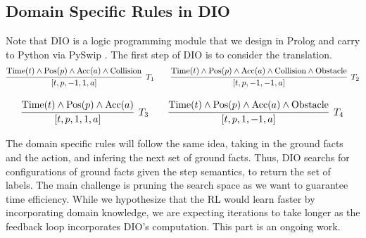 \documentclass[a4paper,11pt]{article}
\theoremstyle{definition}
\begin{document}
\subsection{Domain Specific Rules in DIO}
Note that DIO is a logic programming module that we design in Prolog and 
carry to Python via PySwip \cite{tekol2020}.
The first step of DIO is to consider the translation. 
\[
  \infer[T_1]{[t, p, -1, 1, a]}{\text{Time}(t) \wedge \text{Pos}(p) 
                                \wedge \text{Acc}(a) \wedge
                              \text{Collision}}
   \qquad
   \infer[T_2]{[t, p, -1, -1, a]}{\text{Time}(t) \wedge \text{Pos}(p) 
                                  \wedge \text{Acc}(a) \wedge
                                  \text{Collision} \wedge \text{Obstacle}}
\]

\[
  \infer[T_3]{[t, p, 1, 1, a]}{\text{Time}(t) \wedge \text{Pos}(p) 
                                \wedge \text{Acc}(a)
                            }
   \qquad
   \infer[T_4]{[t, p, 1, -1, a]}{\text{Time}(t) \wedge \text{Pos}(p) 
                                  \wedge \text{Acc}(a) \wedge \text{Obstacle}}
\]

The domain specific rules will follow the same idea, taking in the ground facts and the action, 
and infering the next set of ground facts. Thus, DIO searchs for configurations of ground facts given the step semantics, 
to return the set of labels. The main challenge is pruning the search space as we want to 
guarantee time efficiency. While we hypothesize that the RL would learn faster by incorporating 
domain knowledge, we are expecting iterations to take longer as the feedback loop incorporates DIO's computation. This part is an ongoing work. 
\end{document}
